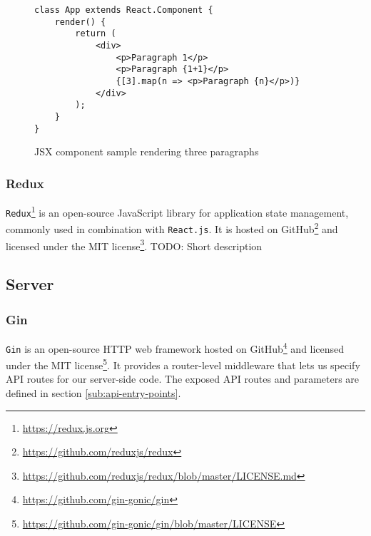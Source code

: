 \begin{figure}[H]
\begin{verbatim}
class App extends React.Component {
    render() {
        return (
            <div>
                <p>Paragraph 1</p>
                <p>Paragraph {1+1}</p>
                {[3].map(n => <p>Paragraph {n}</p>)}
            </div>
        );
    }
}
\end{verbatim}
\caption{JSX component sample rendering three paragraphs}
\end{figure}


\subsubsection{Redux}
\texttt{Redux}\footnote{\url{https://redux.js.org}} is an open-source JavaScript library for application state management, commonly used in combination with \texttt{React.js}.
It is hosted on GitHub\footnote{\url{https://github.com/reduxjs/redux}} and licensed under the MIT license\footnote{\url{https://github.com/reduxjs/redux/blob/master/LICENSE.md}}.
TODO: Short description 

\subsection{Server}

\subsubsection{Gin}
\texttt{Gin} is an open-source HTTP web framework hosted on GitHub\footnote{\url{https://github.com/gin-gonic/gin}} and licensed under the MIT license\footnote{\url{https://github.com/gin-gonic/gin/blob/master/LICENSE}}.
It provides a router-level middleware that lets us specify API routes for our server-side code. The exposed API routes and parameters are defined in section \ref{sub:api-entry-points}.




